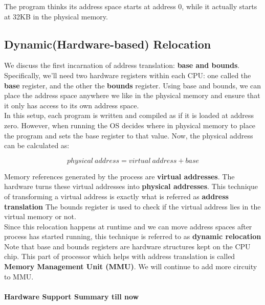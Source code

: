 The program thinks its address space starts at address 0, while it actually
starts at 32KB in the physical memory.

\subsection{Dynamic(Hardware-based) Relocation}

We discuss the first incarnation of address translation:
\textbf{base and bounds}.\\

Specifically, we'll need two hardware registers within each CPU: one called
the \textbf{base} register, and the other the \textbf{bounds} register. Using
base and bounds, we can place the address space anywhere we like in the 
physical memory and ensure that it only has access to its own address space.\\

In this setup, each program is written and compiled as if it is loaded at
address zero. However, when running the OS decides where in physical memory
to place the program and sets the base register to that value. Now, the 
physical address can be calculated as:

$$
physical\ address = virtual\ address + base
$$

Memory references generated by the process are \textbf{virtual addresses}. The
hardware turns these virtual addresses into \textbf{physical addresses}.
This technique of transforming a virtual address is exactly what is referred as
\textbf{address translation}
The bounds register is used to check if the virtual address lies in the virtual
memory or not.\\

Since this relocation happens at runtime and we can move address spaces after
process has started running, this technique is referred to as \textbf{dynamic
relocation}\\

Note that base and bounds registers are hardware structures kept on the CPU
chip. This part of processor which helps with address translation is called
\textbf{Memory Management Unit (MMU)}. We will continue to add more circuity
to MMU.\\

\paragraph{Hardware Support Summary till now}

